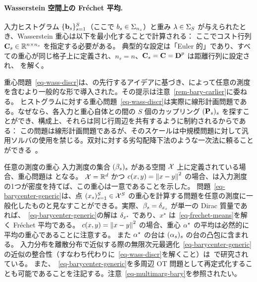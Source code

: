 \paragraph{Wasserstein 空間上の Fr\'echet 平均.}

入力ヒストグラム $\{\b_s\}_{s=1}^S$（ここで $b_s \in \simplex_{n_s}$）と重み $\la \in \simplex_S$ が与えられたとき、Wasserstein 重心は以下を最小化することで計算される：
ここでコスト行列 $\C_s \in \RR^{n \times n_s}$ を指定する必要がある。
典型的な設定は「Euler 的」であり、すべての重心が同じ格子上に定義され、$n_s=n$、$\C_s=\C=\distD^p$ は距離行列に設定され、
を解く。

重心問題~\eqref{eq-wass-discr}は、\citet{carlierekelandmatching}の先行するアイデアに基づき、\citet{Carlier_wasserstein_barycenter}によって任意の測度を含むより一般的な形で導入された。その提示は注意~\ref{rem-bary-carlier}に委ねる。
ヒストグラムに対する重心問題~\eqref{eq-wass-discr}は実際に線形計画問題である。なぜなら、各入力と重心自体との間の $S$ 個のカップリング $(\P_s)_s$ を探すことができ、構成上、それらは同じ行周辺を共有するように制約されるからである：
この問題は線形計画問題であるが、そのスケールは中規模問題に対して汎用ソルバの使用を禁じる。双対に対する劣勾配降下法のような一次法に頼ることができる~\citep{Carlier-NumericsBarycenters}。

\begin{rem2}{任意の測度の重心}\label{rem-bary-carlier}
	入力測度の集合 $(\be_s)_s$ がある空間 $\X$ 上に定義されている場合、重心問題は
	となる。
	$\X=\RR^d$ かつ $c(x,y)=\norm{x-y}^2$ の場合、\citet{Carlier_wasserstein_barycenter}は入力測度の1つが密度を持てば、この重心は一意であることを示した。
	問題~\eqref{eq-barycenter-generic}は、点 $(x_s)_{s=1}^S \in \X^S$ の重心を計算する問題を任意の測度に一般化したものと見なすことができる。実際、$\be_s=\de_{x_s}$ が単一の Dirac 質量であれば、~\eqref{eq-barycenter-generic}の解は $\de_{x^\star}$ であり、$x^\star$ は~\eqref{eq-frechet-means}を解く Fr\'echet 平均である。
	$c(x,y)=\norm{x-y}^2$ の場合、重心 $\al^\star$ の平均は必然的に平均の重心であることに注意する。\ie
	また $\al^\star$ の台は $(\al_s)_s$ の台の凸包に含まれる。
	入力分布を離散分布で近似する際の無限次元最適化~\eqref{eq-barycenter-generic}の近似の整合性（すなわち代わりに~\eqref{eq-wass-discr}を解くこと）は~\citet{Carlier-NumericsBarycenters}で研究されている。
	また、~\eqref{eq-barycenter-generic}を多周辺 OT 問題として再定式化することも可能であることを注記する。注意~\ref{eq-multimarg-bary}を参照されたい。
\end{rem2}

